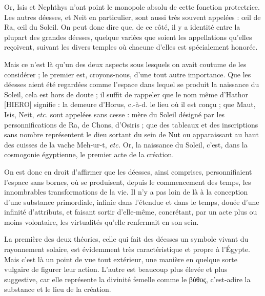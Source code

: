 \documentclass[a4paper, 11pt, oneside]{article}
\begin{document}
Or, Isis et Nephthys n'ont point le monopole absolu de cette fonction protectrice. Les autres déesses, et Neit en particulier, sont aussi très souvent appelées : œil de Ra, œil du Soleil. On peut donc dire que, de ce côté, il y a identité entre la plupart des grandes déesses, quelque variées que soient les appellations qu'elles reçoivent, suivant les divers temples où chacune d'elles est spécialement honorée.

Mais ce n'est là qu'un des deux aspects sous lesquels on avait coutume de les considérer ; le premier est, croyons-nous, d'une tout autre importance. Que les déesses aient été regardées comme l'espace dans lequel se produit la naissance du Soleil, cela est hors de doute ; il suffit de rappeler que le nom même d'Hathor [HIERO] signifie : la demeure d'Horus, c.-à-d. le lieu où il est conçu ; que Maut, Isis, Neit, \emph{etc.} sont appelées sans cesse : mère du Soleil désigné par les personnifications de Ra, de Chons, d'Osiris ; que des tableaux et des inscriptions sans nombre représentent le dieu sortant du sein de Nut ou apparaissant au haut des cuisses de la vache Meh-ur-t, \emph{etc.} Or, la naissance du Soleil, c'est, dans la cosmogonie égyptienne, le premier acte de la création.

On est donc en droit d'affirmer que les déesses, ainsi comprises, personnifiaient l'espace sans bornes, où se produisent, depuis le commencement des temps, les innombrables transformations de la vie. Il n'y a pas loin de là à la conception d'une substance primordiale, infinie dans l'étendue et dans le temps, douée d'une infinité d'attributs, et faisant sortir d'elle-même, concrétant, par un acte plus ou moins volontaire, les virtualités qu'elle renfermait en son sein.

La première des deux théories, celle qui fait des déesses un symbole vivant du rayonnement solaire, est évidemment très caractéristique et propre à l'Égypte. Mais c'est là un point de vue tout extérieur, une manière en quelque sorte vulgaire de figurer leur action. L'autre est beaucoup plus élevée et plus suggestive, car elle représente la divinité femelle comme le βύθος, c'est-adire la substance et le lieu de la création.
\end{document}

